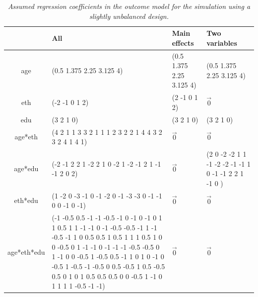 \documentclass[11pt]{article}
\numberwithin{figure}{section}
\numberwithin{table}{section}
\numberwithin{equation}{section}
\begin{document}
\begin{table}
\begin{center}
\caption{\em Assumed regression coefficients in the {\em outcome} model for the simulation using a slightly unbalanced design.}
\label{s1-response-coef}
\small
\begin{tabular}{c|p{4cm}|l|p{4cm}}
&All & Main effects & Two variables\\
\hline
age&(0.5 1.375 2.25 3.125 4)&(0.5 1.375 2.25 3.125 4)&(0.5 1.375 2.25 3.125 4)\\
eth&(-2 -1 0 1 2)&(2 -1 0 1 2)& $\vec{0}$\\
edu&(3 2 1 0)&(3 2 1 0)&(3 2 1 0)\\
age*eth&(4 2 1 1 3 3 2 1 1 1 2 3 2 2 1 4 4 3 2 3 2 4 1 4 1)& $\vec{0}$& $\vec{0}$\\
age*edu&(-2 -1 2 2 1 -2 2 1 0 -2 1 -2 -1 2 1 -1 -1 2 0 2)& $\vec{0}$&(2 0 -2 -2 1 1 -1 -2 -2 -1 -1 1 0 -1 -1 2 2 1 -1 0 )\\
eth*edu&(1 -2 0 -3 -1 0 -1 -2 0 -1 -3 -3 0 -1 -1 0 0 -1 0 -1)& $\vec{0}$& $\vec{0}$\\
age*eth*edu&(-1 -0.5 0.5 -1 -1 -0.5 -1 0 -1 0 -1 0 1 1 0.5 1 1 -1 -1 0 -1 -0.5 -0.5 -1 1 -1 -0.5 -1 1 0 0.5 0.5 1 0.5 1 1 1 0.5 1 0 0 -0.5 0 1 -1 -1 0 -1 -1 -1 -0.5 -0.5 0 1 -1 0 0 -0.5 1 -0.5 0.5 -1 1 0 1 0 -1 0 -0.5 1 -0.5 -1 -0.5 0 0.5 -0.5 1 0.5 -0.5 0.5 0 1 0 1 0.5 0.5 0.5 0 0 -0.5 1 -1 0 1 1 1 1 -0.5 -1 -1)& $\vec{0}$& $\vec{0}$
\end{tabular}
\end{center}
\end{table}
\end{document}
